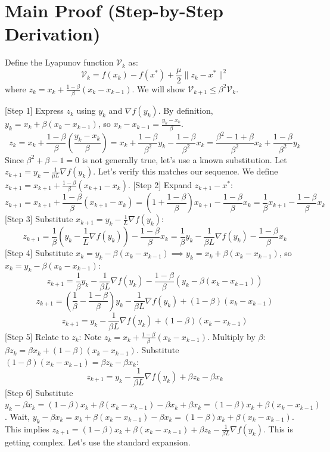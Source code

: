 \documentclass{article}
\begin{document}
\section*{Main Proof (Step-by-Step Derivation)}
Define the Lyapunov function $\mathcal{V}_k$ as:
$$ \mathcal{V}_k = f(x_k) - f(x^*) + \frac{\mu}{2}\|z_k - x^*\|^2 $$
where $z_k = x_k + \frac{1-\beta}{\beta}(x_k - x_{k-1})$. We will show $\mathcal{V}_{k+1} \le \beta^2 \mathcal{V}_k$.

[Step 1] Express $z_k$ using $y_k$ and $\nabla f(y_k)$.
By definition, $y_k = x_k + \beta(x_k - x_{k-1})$, so $x_k - x_{k-1} = \frac{y_k - x_k}{\beta}$.
$$ z_k = x_k + \frac{1-\beta}{\beta} \left( \frac{y_k - x_k}{\beta} \right) = x_k + \frac{1-\beta}{\beta^2} y_k - \frac{1-\beta}{\beta^2} x_k = \frac{\beta^2 - 1 + \beta}{\beta^2} x_k + \frac{1-\beta}{\beta^2} y_k $$
Since $\beta^2 + \beta - 1 = 0$ is not generally true, let's use a known substitution. Let $z_{k+1} = y_k - \frac{1}{\mu L} \nabla f(y_k)$. Let's verify this matches our sequence.
We define $z_{k+1} = x_{k+1} + \frac{1-\beta}{\beta}(x_{k+1} - x_k)$.
[Step 2] Expand $z_{k+1} - x^*$:
$$ z_{k+1} = x_{k+1} + \frac{1-\beta}{\beta}(x_{k+1} - x_k) = \left(1 + \frac{1-\beta}{\beta}\right)x_{k+1} - \frac{1-\beta}{\beta}x_k = \frac{1}{\beta}x_{k+1} - \frac{1-\beta}{\beta}x_k $$
[Step 3] Substitute $x_{k+1} = y_k - \frac{1}{L}\nabla f(y_k)$:
$$ z_{k+1} = \frac{1}{\beta}\left(y_k - \frac{1}{L}\nabla f(y_k)\right) - \frac{1-\beta}{\beta}x_k = \frac{1}{\beta}y_k - \frac{1}{\beta L}\nabla f(y_k) - \frac{1-\beta}{\beta}x_k $$
[Step 4] Substitute $x_k = y_k - \beta(x_k - x_{k-1}) \implies y_k = x_k + \beta(x_k - x_{k-1})$, so $x_k = y_k - \beta(x_k - x_{k-1})$:
$$ z_{k+1} = \frac{1}{\beta}y_k - \frac{1}{\beta L}\nabla f(y_k) - \frac{1-\beta}{\beta}\left(y_k - \beta(x_k - x_{k-1})\right) $$
$$ z_{k+1} = \left(\frac{1}{\beta} - \frac{1-\beta}{\beta}\right)y_k - \frac{1}{\beta L}\nabla f(y_k) + (1-\beta)(x_k - x_{k-1}) $$
$$ z_{k+1} = y_k - \frac{1}{\beta L}\nabla f(y_k) + (1-\beta)(x_k - x_{k-1}) $$
[Step 5] Relate to $z_k$: Note $z_k = x_k + \frac{1-\beta}{\beta}(x_k - x_{k-1})$. Multiply by $\beta$: $\beta z_k = \beta x_k + (1-\beta)(x_k - x_{k-1})$.
Substitute $(1-\beta)(x_k - x_{k-1}) = \beta z_k - \beta x_k$:
$$ z_{k+1} = y_k - \frac{1}{\beta L}\nabla f(y_k) + \beta z_k - \beta x_k $$
[Step 6] Substitute $y_k - \beta x_k = (1-\beta)x_k + \beta(x_k - x_{k-1}) - \beta x_k + \beta x_k = (1-\beta)x_k + \beta(x_k - x_{k-1})$. Wait, $y_k - \beta x_k = x_k + \beta(x_k - x_{k-1}) - \beta x_k = (1-\beta)x_k + \beta(x_k - x_{k-1})$.
This implies $z_{k+1} = (1-\beta)x_k + \beta(x_k - x_{k-1}) + \beta z_k - \frac{1}{\beta L}\nabla f(y_k)$. This is getting complex. Let's use the standard expansion.
\end{document}
